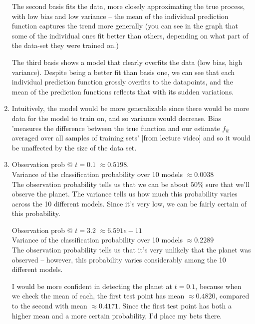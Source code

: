 \documentclass[submit]{harvardml}
\begin{document}
\begin{enumerate}
The second basis fits the data, more closely approximating the true process, with low bias and low variance – the mean of the individual prediction function captures the trend more generally (you can see in the graph that some of the individual ones fit better than others, depending on what part of the data-set they were trained on.) 

The third basis shows a model that clearly overfits the data (low bias, high variance). Despite being a better fit than basis one, we can see that each individual prediction function grossly overfits to the datapoints, and the mean of the prediction functions reflects that with its sudden variations.


\item Intuitively, the model would be more generalizable since there would be more data for the model to train on, and so variance would decrease. Bias 'measures the difference between the true function and our estimate $f_{\hat{w}}$ averaged over all samples of training sets' [from lecture video] and so it would be unaffected by the size of the data set.

\item Observation prob @ $t=0.1$ $\approx 0.5198$.\\
Variance of the classification probability over 10 models $\approx 0.0038$\\
The observation probability tells us that we can be about $50\%$ sure that we'll observe the planet. The variance tells us how much this probability varies across the 10 different models. Since it's very low, we can be fairly certain of this probability.

Observation prob @ $t=3.2$ $\approx 6.591e-11$\\
Variance of the classification probability over 10 models $\approx 0.2289$\\
The observation probability tells us that it's very unlikely that the planet was observed -- however, this probability varies considerably among the 10 different models.

I would be more confident in detecting the planet at $t=0.1$, because when we check the mean of each, the first test point has mean $\approx 0.4820$, compared to the second with mean $\approx 0.4171$. Since the first test point has both a higher mean and a more certain probability, I'd place my bets there.

\end{enumerate}

\end{document}
